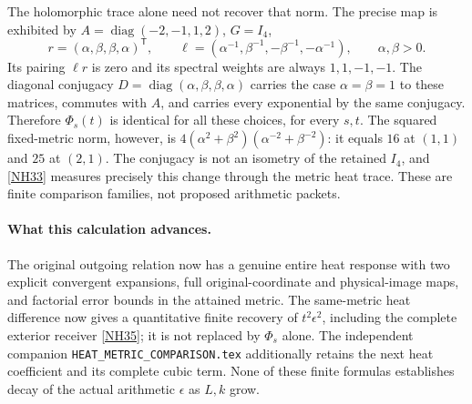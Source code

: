 \documentclass[11pt]{article}
\newcommand{\eps}{\epsilon}\newcommand{\spec}{\operatorname{spec}}
\begin{document}
The holomorphic trace alone need not recover that norm.
The precise map is exhibited by
\(A=\operatorname{diag}(-2,-1,1,2)\), \(G=I_4\),
\[
r=(\alpha,\beta,\beta,\alpha)^{\mathsf T},\qquad
\ell=(\alpha^{-1},\beta^{-1},-\beta^{-1},-\alpha^{-1}),
\qquad \alpha,\beta>0.
\]
Its pairing \(\ell r\) is zero and its spectral weights
are always \(1,1,-1,-1\).
The diagonal conjugacy
\(D=\operatorname{diag}(\alpha,\beta,\beta,\alpha)\)
carries the case \(\alpha=\beta=1\) to these matrices,
commutes with \(A\), and carries every exponential by
the same conjugacy. Therefore \(\Phi_s(t)\) is identical
for all these choices, for every \(s,t\).
The squared fixed-metric norm, however, is
\(4(\alpha^2+\beta^2)(\alpha^{-2}+\beta^{-2})\):
it equals \(16\) at \((1,1)\) and \(25\) at \((2,1)\).
The conjugacy is not an isometry of the retained
\(I_4\), and \eqref{NH33} measures precisely this
change through the metric heat trace.
These are finite comparison families, not proposed
arithmetic packets.

\paragraph{What this calculation advances.}
The original outgoing relation now has a genuine entire
heat response with two explicit convergent expansions,
full original-coordinate and physical-image maps, and
factorial error bounds in the attained metric.
The same-metric heat difference now gives a quantitative
finite recovery of \(t^2\eps^2\), including the complete
exterior receiver \eqref{NH35}; it is not replaced by
\(\Phi_s\) alone. The independent companion
\texttt{HEAT\_METRIC\_COMPARISON.tex} additionally retains
the next heat coefficient and its complete cubic term.
None of these finite formulas establishes decay of the
actual arithmetic \(\eps\) as \(L,k\) grow.
\end{document}
